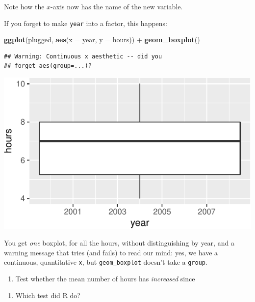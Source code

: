 \documentclass[]{tufte-book}
\newenvironment{Shaded}{}{}
\newcommand{\DataTypeTok}[1]{\textcolor[rgb]{0.56,0.13,0.00}{#1}}
\newcommand{\KeywordTok}[1]{\textcolor[rgb]{0.00,0.44,0.13}{\textbf{#1}}}
\newcommand{\NormalTok}[1]{#1}
\newcommand{\OperatorTok}[1]{\textcolor[rgb]{0.40,0.40,0.40}{#1}}
\newcommand{\StringTok}[1]{\textcolor[rgb]{0.25,0.44,0.63}{#1}}
\providecommand{\tightlist}{%
  \setlength{\itemsep}{0pt}\setlength{\parskip}{0pt}}
\theoremstyle{definition}
\theoremstyle{definition}
\theoremstyle{definition}
\theoremstyle{remark}
\begin{document}
Note how the \(x\)-axis now has the name of the new variable.

If you forget to make \texttt{year} into a factor, this happens:

\begin{Shaded}
\begin{Highlighting}[]
\KeywordTok{ggplot}\NormalTok{(plugged, }\KeywordTok{aes}\NormalTok{(}\DataTypeTok{x =}\NormalTok{ year, }\DataTypeTok{y =}\NormalTok{ hours)) }\OperatorTok{+}\StringTok{ }\KeywordTok{geom_boxplot}\NormalTok{()}
\end{Highlighting}
\end{Shaded}

\begin{verbatim}
## Warning: Continuous x aesthetic -- did you
## forget aes(group=...)?
\end{verbatim}

\includegraphics{05-two-sample-inference_files/figure-latex/unnamed-chunk-7-1}

You get \emph{one} boxplot, for all the hours, without distinguishing by
year, and a warning message that tries (and fails) to read our mind:
yes, we have a continuous, quantitative \texttt{x}, but
\texttt{geom\_boxplot} doesn't take a \texttt{group}.

\begin{enumerate}
\def\labelenumi{(\alph{enumi})}
\setcounter{enumi}{2}
\tightlist
\item
  Test whether the mean number of hours has \emph{increased} since
\end{enumerate}

\begin{enumerate}
\def\labelenumi{\arabic{enumi}.}
\setcounter{enumi}{1998}
\tightlist
\item
  Which test did R do?
\end{enumerate}
\end{document}
